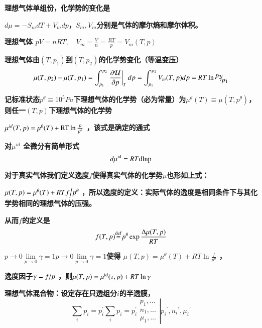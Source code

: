 \documentclass{article} %
\begin{document}
{\bf  理想气体单组份，化学势的变化是}

\noindent 
{\bf $d\mu =-S_{m} dT+V_{m} dp$，$S_{m} ,V_{m} $分别是气体的摩尔熵和摩尔体积。}

\noindent 
{\bf 理想气体 $pV=nRT,\quad V_{m} =\frac{V}{n} =\frac{RT}{p} =V_{m} (T,p)$      }

\noindent 
{\bf 理想气体由$\left(T,p_{1} \right)$到$\left(T,p_{2} \right)$的化学势变化（等温变压）
\[\mu (T,p_{2} )-\mu (T,p_{1} )=\int _{p_{1} }^{p_{2} }\left. \frac{\partial \mathrm{{\mathcal U}}}{\partial p} \right|_{T}  dp=\int _{p_{1} }^{p_{2} }V_{m} (T,p) dp=RT\ln {\raise0.7ex\hbox{$ p_{2}  $}\!\mathord{\left/ {\vphantom {p_{2}  p_{1} }} \right. \kern-\nulldelimiterspace}\!\lower0.7ex\hbox{$ p_{1}  $}} \] }

{\bf 记标准状态$p^{\theta } \equiv 10^{5} Pa$下理想气体的化学势（必为常量）为$\mu ^{\theta } (T)\equiv \mu (T,p^{\theta } )$，则任一$\left(T,p\right)$下理想气体的化学势}

\noindent 
{\bf $\mu ^{id} (T,p)=\mu ^{\theta } (T)+{\rm RT}\ln \frac{p}{p^{\theta } } $ ，该式是确定的通式}

\noindent 
{\bf 对$\mu ^{id} $ 全微分有简单形式
\[d\mu ^{{\rm id}} =RT{\rm dlnp}\] }

{\bf 对于真实气体我们定义逸度$f$使得真实气体的化学势$\mu $也形如上式：}

\noindent 
{\bf $\mu (T,p)=\mu ^{\theta } (T)+RT{f\mathord{\left/ {\vphantom {f p^{\theta } }} \right. \kern-\nulldelimiterspace} p^{\theta } } $ ，所以逸度的定义：实际气体的逸度是相同条件下与其化学势相同的理想气体的压强。}

\noindent 
{\bf 从而$f$的定义是
\[f(T,p){\mathop{=}\limits^{{\rm def}}} p^{\theta } \exp \frac{{\rm \Delta }\mu (T,p)}{RT} \] }

{\bf $p\to 0$${\mathop{\lim }\limits_{p\to 0}} \gamma =1$$p\to 0$${\mathop{\lim }\limits_{p\to 0}} \gamma =1$使得 $\mu (T,p)=\mu ^{\theta } (T)+RT\ln \frac{f}{p^{\theta } } $ ，}

\noindent 
{\bf 逸度因子$\gamma ={f\mathord{\left/ {\vphantom {f p}} \right. \kern-\nulldelimiterspace} p} $ ，则$\mu (T,p)=\mu ^{{\rm id}} (\tau ,p)+RT\ln \gamma $ }


{\bf  理想气体混合物：设定存在只透组分$i$的半透膜，
\[\sum _{i}p _{i} =p_{i}^{{'} } \sum _{i}p _{i} =p_{i}^{{'} } \left. \begin{array}{c} {p_{1} ,...} \\ {n_{1} ,...} \\ {\mu _{1} ,...} \end{array}\right|p_{i} {}^{'} ,n_{i} {}^{'} ,\mu _{i} {}^{'} \] }
\end{document}
